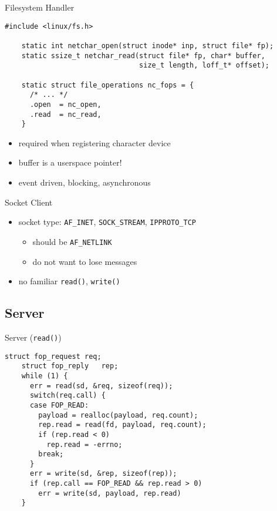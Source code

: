 \documentclass[handout]{beamer}
\begin{document}
\begin{frame}[fragile]{Filesystem Handler}
  \begin{lstlisting}[gobble=4]
    #include <linux/fs.h>

    static int netchar_open(struct inode* inp, struct file* fp);
    static ssize_t netchar_read(struct file* fp, char* buffer,
                                size_t length, loff_t* offset);

    static struct file_operations nc_fops = {
      /* ... */
      .open  = nc_open,
      .read  = nc_read,
    }
  \end{lstlisting}

  \begin{itemize}
    \item<1-> required when registering character device
    \item<2-> buffer is a userspace pointer!
    \item<3-> event driven, blocking, asynchronous
  \end{itemize}
\end{frame}

\begin{frame}{Socket Client}
  \begin{itemize}
    \item<1-> socket type: \texttt{AF\_INET}, \texttt{SOCK\_STREAM}, \texttt{IPPROTO\_TCP}
    \begin{itemize}
      \item<2-> should be \texttt{AF\_NETLINK}
      \item<2-> do not want to lose messages
    \end{itemize}
    \item<3-> no familiar \texttt{read()}, \texttt{write()}
  \end{itemize}
\end{frame}

\subsection{Server}

\begin{frame}[fragile]{Server (\texttt{read()})}
  \begin{lstlisting}[gobble=4]
    struct fop_request req;
    struct fop_reply   rep;
    while (1) {
      err = read(sd, &req, sizeof(req));
      switch(req.call) {
      case FOP_READ:
        payload = realloc(payload, req.count);
        rep.read = read(fd, payload, req.count);
        if (rep.read < 0)
          rep.read = -errno;
        break;
      }
      err = write(sd, &rep, sizeof(rep));
      if (rep.call == FOP_READ && rep.read > 0)
        err = write(sd, payload, rep.read)
    }
  \end{lstlisting}
\end{frame}
\end{document}
